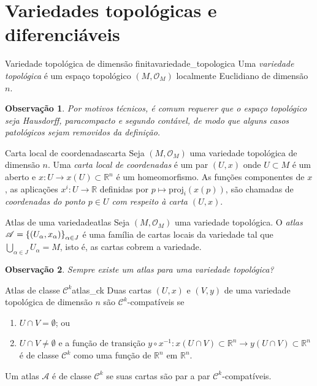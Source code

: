 \documentclass[12pt,a4paper]{article}
\numberwithin{equation}{section}
\DeclarePairedDelimiter\set{\{}{\}}
\newcommand\family[2]{\ensuremath{\set*{#1}_{#2}}}
\newcommand\topology[1]{\ensuremath{\left(#1, \mathcal{O}_{#1}\right)}}
\newtheorem{remark}{Observação}[section]
\begin{document}
\section{Variedades topológicas e diferenciáveis}
\begin{definition}{Variedade topológica de dimensão finita}{variedade_topologica}
    Uma \emph{variedade topológica} é um espaço topológico \topology{M} localmente Euclidiano de dimensão \(n\).
\end{definition}
\begin{remark}
    Por motivos técnicos, é comum requerer que o espaço topológico seja Hausdorff, paracompacto e segundo contável, de modo que alguns casos patológicos sejam removidos da definição.
\end{remark}
\begin{definition}{Carta local de coordenadas}{carta}
    Seja \topology{M} uma variedade topológica de dimensão \(n\). Uma \emph{carta local de coordenadas} é um par \((U,x)\) onde \(U \subset M\) é um aberto e \(x : U \to x(U) \subset \mathbb{R}^n\) é um homeomorfismo. As funções componentes de \(x\), as aplicações \(x^i : U \to \mathbb{R}\) definidas por \(p \mapsto \mathrm{proj}_i(x(p))\), são chamadas de \emph{coordenadas do ponto \(p \in U\) com respeito à carta \((U, x)\)}.
\end{definition}

\begin{definition}{Atlas de uma variedade}{atlas}
    Seja \topology{M} uma variedade topológica. O \emph{atlas} \(\mathscr{A} = \family{(U_\alpha, x_\alpha)}{\alpha\in J}\) é uma família de cartas locais da variedade tal que \(\bigcup_{\alpha \in J}U_\alpha = M\), isto é, as cartas cobrem a variedade.
\end{definition}
\begin{remark}
    Sempre existe um atlas para uma variedade topológica?
\end{remark}

\begin{definition}{Atlas de classe \(\mathcal{C}^k\)}{atlas_ck}
    Duas cartas \((U,x)\) e \((V, y)\) de uma variedade topológica de dimensão \(n\) são \(\mathcal{C}^k\)-compatíveis se
    \begin{enumerate}[label=(\alph*)]
        \item \(U \cap V = \emptyset\); ou
        \item \(U \cap V \neq \emptyset\) e a função de transição \(y \circ x^{-1} : x(U \cap V) \subset \mathbb{R}^n\to y(U \cap V) \subset \mathbb{R}^n\) é de classe \(\mathcal{C}^k\) como uma função de \(\mathbb{R}^n\) em \(\mathbb{R}^n\).
    \end{enumerate}
    Um atlas \(\mathscr{A}\) é de classe \(\mathcal{C}^k\) se suas cartas são par a par \(\mathcal{C}^k\)-compatíveis.
\end{definition}
\end{document}
